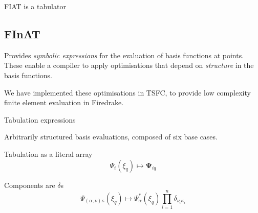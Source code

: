 \documentclass[a0paper,portrait]{baposter}
\begin{document}
\begin{poster}
\begin{posterbox}[name=introduction,span=6,column=0,row=0]{FIAT is a
      tabulator}
\begin{minipage}[t]{0.49\textwidth}
      \subsection*{FInAT}
      \vspace{-0.25\baselineskip}
      Provides \emph{symbolic expressions} for the evaluation of
      basis functions at points.  These enable a compiler to apply
      optimisations that depend on \emph{structure} in the basis
      functions.

      We have implemented these optimisations in TSFC, to provide
      low complexity finite element evaluation in Firedrake.
    \end{minipage}
  \end{posterbox}

  \begin{posterbox}[name=structure, column=0, below=introduction,
    span=3, height=0.275,
    ]{Tabulation expressions}
    \raggedright
    Arbitrarily structured basis evaluations, composed of six base cases.
    \begin{tcbraster}[raster columns=6,raster equal height=rows]
      \begin{tcolorbox}[title=FIAT, raster multicolumn=3]
        Tabulation as a literal array
        \vspace{-0.5\baselineskip}
        \begin{equation*}
          \Psi_i(\xi_q) \mapsto \mathbf{\Psi}_{iq}
        \end{equation*}
      \end{tcolorbox}
      \begin{tcolorbox}[title=Tensor-valued, raster multicolumn=3]
        Components are $\delta$s
        \vspace{-0.5\baselineskip}
        \begin{equation*}
          \Psi_{(\alpha, \nu)\kappa}(\xi_q) \mapsto \Psi_{\alpha}^*(\xi_q) \prod_{i=1}^n \delta_{\nu_i \kappa_i}
        \end{equation*}
      \end{tcolorbox}
      \begin{tcolorbox}[title=Underintegration, raster multicolumn=2]
        \vspace{-0.5\baselineskip}
        \begin{equation*}

\end{equation*}
\end{tcolorbox}
\end{tcbraster}
\end{posterbox}
\end{poster}
\end{document}
